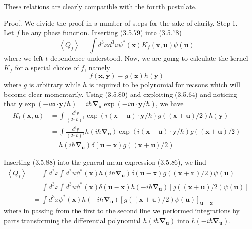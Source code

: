\documentclass{article}
\begin{document}
These relations are clearly compatible with the fourth postulate.

Proof. We divide the proof in a number of steps for the sake of clarity.
Step 1. Let $f$ be any phase function. Inserting (3.5.79) into (3.5.78)
$$
\begin{equation*}
\left\langle Q_{f}\right\rangle=\int d^{3} x d^{3} u \psi^{*}(\boldsymbol{x}) K_{f}(\boldsymbol{x}, \boldsymbol{u}) \psi(\boldsymbol{u}) \tag{3.5.86}
\end{equation*}
$$
where we left $t$ dependence understood. Now, we are going to calculate the kernel $K_{f}$ for a special choice of $f$, namely
$$
\begin{equation*}
f(\boldsymbol{x}, \boldsymbol{y})=g(\boldsymbol{x}) h(\boldsymbol{y}) \tag{3.5.87}
\end{equation*}
$$
where $g$ is arbitrary while $h$ is required to be polynomial for reasons which will become clear momentarily. Using (3.5.80) and exploiting (3.5.64) and noticing that $\boldsymbol{y} \exp (-i \boldsymbol{u} \cdot \boldsymbol{y} / \hbar)=i \hbar \boldsymbol{\nabla}_{\boldsymbol{u}} \exp (-i \boldsymbol{u} \cdot \boldsymbol{y} / \hbar)$, we have
$$
\begin{align*}
K_{f}(\boldsymbol{x}, \boldsymbol{u}) & =\int \frac{d^{3} y}{(2 \pi \hbar)^{3}} \exp (i(\boldsymbol{x}-\boldsymbol{u}) \cdot \boldsymbol{y} / \hbar) g((\boldsymbol{x}+\boldsymbol{u}) / 2) h(\boldsymbol{y})  \tag{3.5.88}\\
& =\int \frac{d^{3} y}{(2 \pi \hbar)^{3}} h\left(i \hbar \boldsymbol{\nabla}_{\boldsymbol{u}}\right) \exp (i(\boldsymbol{x}-\boldsymbol{u}) \cdot \boldsymbol{y} / \hbar) g((\boldsymbol{x}+\boldsymbol{u}) / 2) \\
& =h\left(i \hbar \boldsymbol{\nabla}_{\boldsymbol{u}}\right) \delta(\boldsymbol{u}-\boldsymbol{x}) g((\boldsymbol{x}+\boldsymbol{u}) / 2)
\end{align*}
$$

Inserting (3.5.88) into the general mean expression (3.5.86), we find
$$
\begin{align*}
\left\langle Q_{f}\right\rangle & =\int d^{3} x \int d^{3} u \psi^{*}(\boldsymbol{x}) h\left(i \hbar \boldsymbol{\nabla}_{\boldsymbol{u}}\right) \delta(\boldsymbol{u}-\boldsymbol{x}) g((\boldsymbol{x}+\boldsymbol{u}) / 2) \psi(\boldsymbol{u})  \tag{3.5.89}\\
& =\int d^{3} x \int d^{3} u \psi^{*}(\boldsymbol{x}) \delta(\boldsymbol{u}-\boldsymbol{x}) h\left(-i \hbar \boldsymbol{\nabla}_{\boldsymbol{u}}\right)[g((\boldsymbol{x}+\boldsymbol{u}) / 2) \psi(\boldsymbol{u})] \\
& =\int d^{3} x \psi^{*}(\boldsymbol{x}) h\left(-i \hbar \boldsymbol{\nabla}_{\boldsymbol{u}}\right)[g((\boldsymbol{x}+\boldsymbol{u}) / 2) \psi(\boldsymbol{u})]_{\boldsymbol{u}=\boldsymbol{x}}
\end{align*}
$$
where in passing from the first to the second line we performed integrations by parts transforming the differential polynomial $h\left(i \hbar \boldsymbol{\nabla}_{\boldsymbol{u}}\right)$ into $h\left(-i \hbar \boldsymbol{\nabla}_{\boldsymbol{u}}\right)$.
\end{document}
